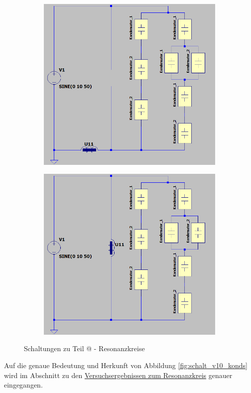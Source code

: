 \documentclass[10pt,a4paper]{article}
\makeatletter
\newcommand*{\rom}[1]{\expandafter\@slowromancap\romannumeral #1@}
\makeatother
\begin{document}
\begin{flushleft}
\begin{figure}[H]
\begin{subfigure}{0.5\linewidth}
\centering
\includegraphics[scale=0.4]{Schalt_v10_reihe}
\label{fig:schalt_v10_schwi_reihe}
\end{subfigure}%
\begin{subfigure}{0.5\linewidth}
\centering
\includegraphics[scale=0.4]{Schalt_v10_para}
\label{fig:schalt_v10_schwi_para}
\end{subfigure}%

\caption{Schaltungen zu Teil \rom{3} - Resonanzkreise}
\label{fig:SCHALT_RESO}
\end{figure}
Auf die genaue Bedeutung und Herkunft von Abbildung \ref{fig:schalt_v10_konds} wird im Abschnitt zu den \hyperlink{sec:erg_resk}{Versuchsergebnissen zum Resonanzkreis} genauer eingegangen.
\end{flushleft}
\end{document}
